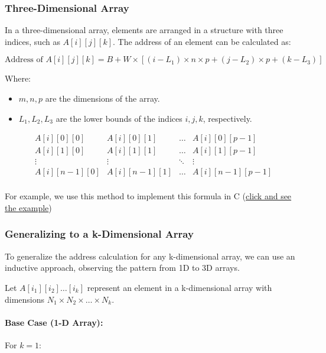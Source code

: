 \documentclass{book}
\begin{document}
\subsubsection{Three-Dimensional Array}

In a three-dimensional array, elements are arranged in a structure with three indices, such as \( A[i][j][k] \). The address of an element can be calculated as:

\[
\text{Address of } A[i][j][k] = B + W \times \left[ (i - L_1) \times n \times p + (j - L_2) \times p + (k - L_3) \right]
\]

Where:
\begin{itemize}
	\item \( m, n, p \) are the dimensions of the array.
	\item \( L_1, L_2, L_3 \) are the lower bounds of the indices \( i, j, k \), respectively.
\end{itemize}

\[
\begin{array}{c|c|c|c}
	A[i][0][0] & A[i][0][1] & \dots & A[i][0][p-1] \\
	\hline
	A[i][1][0] & A[i][1][1] & \dots & A[i][1][p-1] \\
	\hline
	\vdots & \vdots & \ddots & \vdots \\
	\hline
	A[i][n-1][0] & A[i][n-1][1] & \dots & A[i][n-1][p-1] \\
\end{array}
\]

For example, we use this method to implement this formula in C (\href{https://github.com/m-mdy-m/Arliz/blob/main/AddressCalculation/Three-Dimensional.c}{click and see the example})

\subsubsection{Generalizing to a k-Dimensional Array}

To generalize the address calculation for any k-dimensional array, we can use an inductive approach, observing the pattern from 1D to 3D arrays.

Let \( A[i_1][i_2] \dots [i_k] \) represent an element in a k-dimensional array with dimensions \( N_1 \times N_2 \times \dots \times N_k \).

\paragraph{Base Case (1-D Array):}
For \( k = 1 \):
\end{document}
